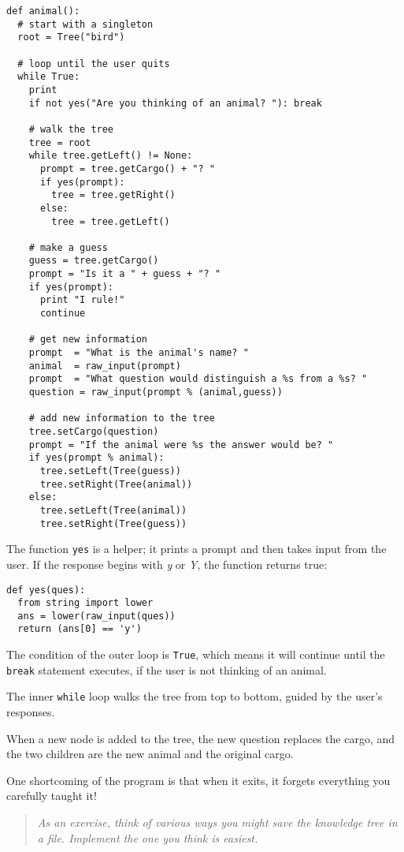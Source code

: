 \beforeverb
\begin{verbatim}
def animal():
  # start with a singleton
  root = Tree("bird")

  # loop until the user quits
  while True:
    print
    if not yes("Are you thinking of an animal? "): break

    # walk the tree
    tree = root
    while tree.getLeft() != None:
      prompt = tree.getCargo() + "? "
      if yes(prompt):
        tree = tree.getRight()
      else:
        tree = tree.getLeft()

    # make a guess
    guess = tree.getCargo()
    prompt = "Is it a " + guess + "? "
    if yes(prompt):
      print "I rule!"
      continue

    # get new information
    prompt  = "What is the animal's name? "
    animal  = raw_input(prompt)
    prompt  = "What question would distinguish a %s from a %s? "
    question = raw_input(prompt % (animal,guess))

    # add new information to the tree
    tree.setCargo(question)
    prompt = "If the animal were %s the answer would be? "
    if yes(prompt % animal):
      tree.setLeft(Tree(guess))
      tree.setRight(Tree(animal))
    else:
      tree.setLeft(Tree(animal))
      tree.setRight(Tree(guess))
\end{verbatim}
\afterverb
%
The function {\tt yes} is a helper; it prints a prompt and then
takes input from the user.  If the response
begins with {\em y} or {\em Y}, the function returns true:

\beforeverb
\begin{verbatim}
def yes(ques):
  from string import lower
  ans = lower(raw_input(ques))
  return (ans[0] == 'y')
\end{verbatim}
\afterverb
%
The condition of the outer loop is {\tt True}, which means it will
continue until the {\tt break} statement executes, if the user
is not thinking of an animal.

The inner {\tt while} loop walks the tree from top to bottom,
guided by the user's responses.

When a new node is added to the tree, the new question replaces
the cargo, and the two children are the new animal and the original
cargo.

One shortcoming of the program is that when it exits, it forgets
everything you carefully taught it!

\begin{quote}
{\em As an exercise, think of various ways you might save
the knowledge tree in a file.  Implement the one you think
is easiest.}
\end{quote}


